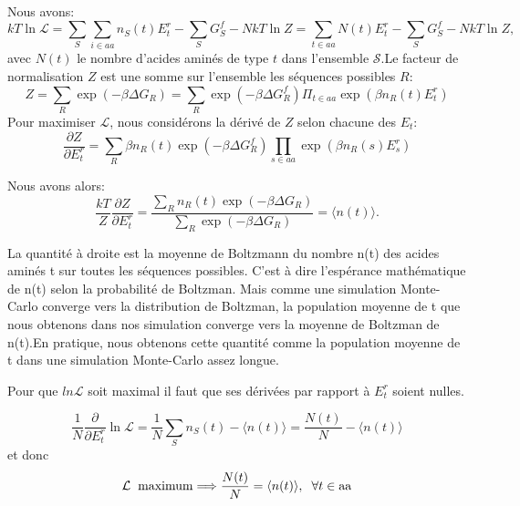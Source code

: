 Nous avons:
\begin{equation}
kT \ln \mathcal{L} = \sum_S\sum_{i \in aa} n_S(t) E^r_t - \sum_S G^f_S - N kT \ln Z = \sum_{t \in aa} N(t) E^r_t - \sum_S G^f_S - N kT \ln Z,
\end{equation}
avec $N(t)$ le nombre d'acides aminés de type $t$ dans l'ensemble $\mathcal{S}$.Le facteur de normalisation $Z$ est une somme sur l'ensemble les séquences possibles $R$:
\begin{equation}
  Z=\sum_R \exp(-\beta \Delta G_R) = \sum_R \exp(-\beta\Delta G^f_R)\Pi_{t\in aa}\exp(\beta n_R (t) E^r_t)
\end{equation} 
Pour maximiser $\mathcal{L}$, nous considérons la dérivé de $Z$ selon chacune des $E_t$:
\begin{equation}
\frac{ \partial Z }{ \partial E^r_t } = 
   \sum_R \beta n_R(t) \exp (-\beta \Delta G^f_R) \prod_{s \in aa} \exp(\beta n_R(s) E^r_s) 
\end{equation}

Nous avons alors:
\begin{equation}
\frac{kT}{Z} \frac{ \partial Z }{ \partial E^r_t }
   = \frac{ \sum_R n_R(t) \exp(-\beta \Delta G_R) }{ \sum_R \exp(-\beta \Delta G_R) } = \langle n(t) \rangle.
\end{equation}

La quantité à droite est la moyenne de Boltzmann du nombre n(t) des acides aminés t sur toutes les séquences possibles. C'est à dire l'espérance mathématique de n(t) selon la probabilité de Boltzman. Mais comme une simulation Monte-Carlo converge vers la distribution de Boltzman, la population moyenne de t que nous obtenons dans nos simulation converge vers la moyenne de Boltzman de n(t).En pratique, nous obtenons cette quantité comme la population moyenne de t dans une simulation Monte-Carlo assez longue. 

Pour que $ln \mathcal{L}$ soit maximal il faut que ses dérivées par rapport à $E_t^r$ soient nulles.

\begin{equation}
\frac{1}{N} \frac{\partial}{\partial E^r_t} \ln {\mathcal L} = \frac{1}{N} \sum_S n_S(t) - \langle n(t) \rangle 
   = \frac{N(t)}{N} - \langle n(t) \rangle
\end{equation}
et donc
\begin{displaymath}
{\mathcal L} \hspace*{2mm} {\rm maximum} \Longrightarrow \frac{N(t)}{N} = \langle n(t) \rangle, 
\hspace*{2mm} \forall t \in {\rm aa}
\label{eq:optimum}
\end{displaymath}

